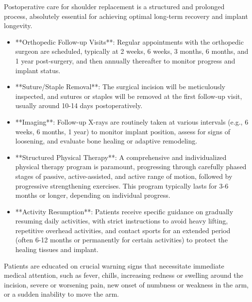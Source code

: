 Postoperative care for shoulder replacement is a structured and prolonged process, absolutely essential for achieving optimal long-term recovery and implant longevity.
\begin{itemize}
  \item **Orthopedic Follow-up Visits**: Regular appointments with the orthopedic surgeon are scheduled, typically at 2 weeks, 6 weeks, 3 months, 6 months, and 1 year post-surgery, and then annually thereafter to monitor progress and implant status.
  \item **Suture/Staple Removal**: The surgical incision will be meticulously inspected, and sutures or staples will be removed at the first follow-up visit, usually around 10-14 days postoperatively.
  \item **Imaging**: Follow-up X-rays are routinely taken at various intervals (e.g., 6 weeks, 6 months, 1 year) to monitor implant position, assess for signs of loosening, and evaluate bone healing or adaptive remodeling.
  \item **Structured Physical Therapy**: A comprehensive and individualized physical therapy program is paramount, progressing through carefully phased stages of passive, active-assisted, and active range of motion, followed by progressive strengthening exercises. This program typically lasts for 3-6 months or longer, depending on individual progress.
  \item **Activity Resumption**: Patients receive specific guidance on gradually resuming daily activities, with strict instructions to avoid heavy lifting, repetitive overhead activities, and contact sports for an extended period (often 6-12 months or permanently for certain activities) to protect the healing tissues and implant.
\end{itemize}
Patients are educated on crucial warning signs that necessitate immediate medical attention, such as fever, chills, increasing redness or swelling around the incision, severe or worsening pain, new onset of numbness or weakness in the arm, or a sudden inability to move the arm.

